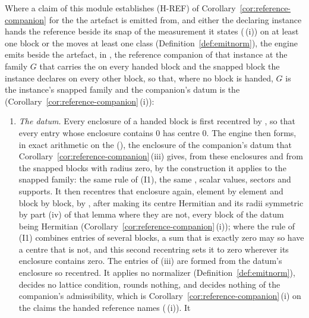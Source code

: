 \begin{requirement}\label{req:reference-companion}
Where a claim of this module establishes (H-REF) of
Corollary~\ref{cor:reference-companion} for the  the
artefact is emitted from, and either the declaring instance hands the
reference beside its snap of the measurement it states
(\,(i)) on at least one block or
the  moves at least one class
(Definition~\ref{def:emitnorm}), the engine emits beside the artefact, in
, the reference companion of that instance at the
family $G$ that carries the  on every handed block and the
snapped block the instance declares on every other block, so that, where no
block is handed, $G$ is the instance's snapped family and the companion's
datum is the 
(Corollary~\ref{cor:reference-companion}\,(i)):
\begin{enumerate}[label=(\roman*),leftmargin=2.4em]
\item \emph{The datum.} Every enclosure of a handed block is first
  recentred by , so that every
  entry whose enclosure contains $0$ has centre $0$. The engine then forms,
  in exact arithmetic on the 
  (), the enclosure of the companion's
  datum that Corollary~\ref{cor:reference-companion}\,(iii) gives, from these
  enclosures and from the snapped blocks with radius zero, by the
  construction it applies to the snapped family: the same rule of (I1), the
  same , scalar values, sectors and supports. It then
  recentres that enclosure again, element by element and block by block,
  by , after making its centre
  Hermitian and its radii symmetric by part (iv) of that lemma where they
  are not, every block of the datum being Hermitian
  (Corollary~\ref{cor:reference-companion}\,(i)); where the rule of (I1)
  combines entries of several blocks, a sum that is exactly zero may so
  have a centre that is not, and this second recentring sets it to zero
  wherever its enclosure contains zero. The entries of (iii) are formed
  from the datum's enclosure so recentred. It applies no
  normalizer (Definition~\ref{def:emitnorm}), decides no lattice condition,
  rounds nothing, and decides nothing of the companion's admissibility,
  which is Corollary~\ref{cor:reference-companion}\,(i) on the claims the
  handed reference names (\,(i)). It

\end{enumerate}
\end{requirement}
